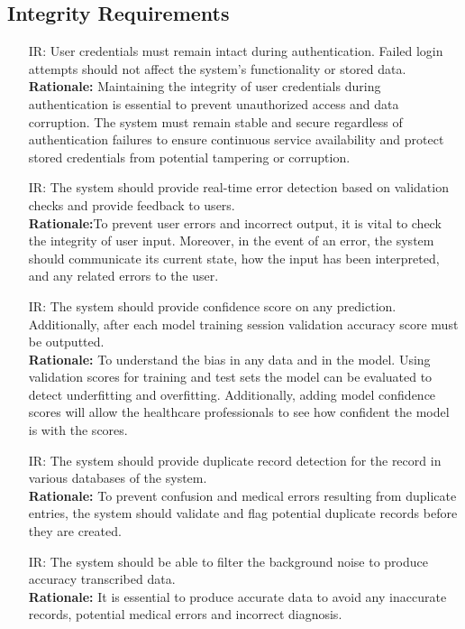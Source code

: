 \documentclass{article}
\newcounter{irnum} %
\begin{document}
\subsection{Integrity Requirements}
\begin{itemize}
    \item [IR\refstepcounter{irnum}\theirnum \label{IR_Autentication}:] User credentials must remain intact during authentication. Failed login attempts should not affect the system's functionality or stored data.\\
    \textbf{Rationale:} Maintaining the integrity of user credentials during authentication is essential to prevent unauthorized access and data corruption. The system must remain stable and secure regardless of authentication failures to ensure continuous service availability and protect stored credentials from potential tampering or corruption.

    \item [IR\refstepcounter{irnum}\theirnum \label{IR_ErrorDetection}:] The system should provide real-time error detection based on validation checks and provide feedback to users.\\
    \textbf{Rationale:}To prevent user errors and incorrect output, it is vital to check the integrity of user input. Moreover, in the event of an error, the system should communicate its current state, how the input has been interpreted, and any related errors to the user.

    \item [IR\refstepcounter{irnum}\theirnum \label{IR_ValidationScore}:] The system should provide confidence score on any prediction. Additionally, after each model training session validation accuracy score must be outputted.\\
    \textbf{Rationale:} To understand the bias in any data and in the model. Using validation scores for training and test sets the model can be evaluated to detect underfitting and overfitting. Additionally, adding model confidence scores will allow  the healthcare professionals to see how confident the model is with the scores.
    
    \item [IR\refstepcounter{irnum}\theirnum \label{IR_DuplicateRecordDetection}:] The system should provide duplicate record detection for the record in various databases of the system.\\
    \textbf{Rationale:} To prevent confusion and medical errors resulting from duplicate entries, the system should validate and flag potential duplicate records before they are created.

    \item [IR\refstepcounter{irnum}\theirnum \label{IR_BackNoiseFilter}:] The system should be able to filter the background noise to produce accuracy transcribed data.\\
    \textbf{Rationale:} It is essential to produce accurate data to avoid any inaccurate records, potential medical errors and incorrect diagnosis. 

\end{itemize}
\end{document}
